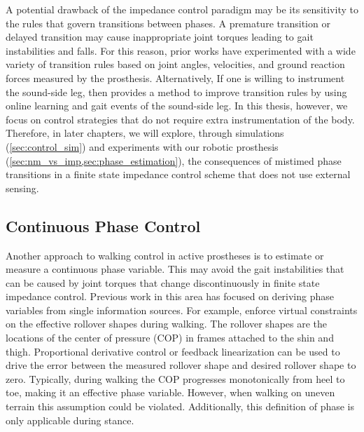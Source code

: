 A potential drawback of the impedance control paradigm may be its sensitivity to
the rules that govern transitions between phases. A premature transition or
delayed transition may cause inappropriate joint torques leading to gait
instabilities and falls. For this reason, prior works have experimented with a
wide variety of transition rules based on joint angles, velocities, and ground
reaction forces measured by the prosthesis. Alternatively, If one is willing to
instrument the sound-side leg, then \citet{liu2014improving} provides a method
to improve transition rules by using online learning and gait events of the
sound-side leg. In this thesis, however, we focus on control strategies that do
not require extra instrumentation of the body. Therefore, in later chapters, we
will explore, through simulations (\cref{sec:control_sim}) and experiments with
our robotic prosthesis (\cref{sec:nm_vs_imp,sec:phase_estimation}), the
consequences of mistimed phase transitions in a finite state impedance control
scheme that does not use external sensing.

\subsection{Continuous Phase Control}\label{sec:back_walk_cont_phase}
Another approach to walking control in active prostheses is to estimate or
measure a continuous phase variable. This may avoid the gait instabilities that
can be caused by joint torques that change discontinuously in finite state
impedance control. Previous work in this area has focused on deriving phase
variables from single information sources. For example, \citet{gregg2014virtual}
enforce virtual constraints on the effective rollover shapes during walking.
The rollover shapes are the locations of the center of pressure (COP) in frames
attached to the shin and thigh. Proportional derivative control or feedback
linearization can be used to drive the error between the measured rollover shape
and desired rollover shape to zero. Typically, during walking the COP progresses
monotonically from heel to toe, making it an effective phase variable. However,
when walking on uneven terrain this assumption could be violated. Additionally,
this definition of phase is only applicable during stance.

